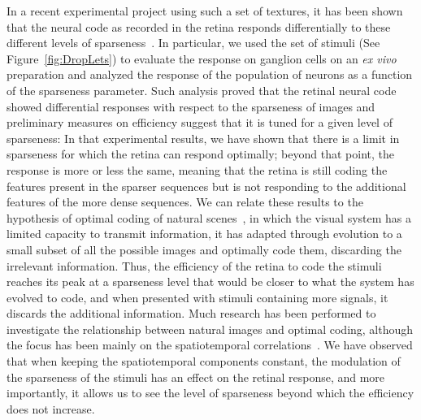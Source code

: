 \documentclass{article}
\begin{document}
In a recent experimental project using such a set of textures, it has been shown that the neural code as recorded in the retina responds differentially to these different levels of sparseness~\citep{Ravello2015}. In particular, we used the set of stimuli (See Figure~\ref{fig:DropLets}) to evaluate the response on ganglion cells on an \emph{ex vivo} preparation and analyzed the response of the population of neurons as a function of the sparseness parameter. Such analysis proved that the retinal neural code showed differential responses with respect to the sparseness of images and preliminary measures on efficiency suggest that it is tuned for a given level of sparseness: In that experimental results, we have shown that there is a limit in sparseness for which the retina can respond optimally; beyond that point, the response is more or less the same, meaning that the retina is still coding the features present in the sparser sequences but is not responding to the additional features of the more dense sequences. We can relate these results to the hypothesis of optimal coding of natural scenes~\citep{Geisler:2008gu}, in which the visual system has a limited capacity to transmit information, it has adapted through evolution to a small subset of all the possible images and optimally code them, discarding the irrelevant information. Thus, the efficiency of the retina to code the stimuli reaches its peak at a sparseness level that would be closer to what the system has evolved to code, and when presented with stimuli containing more signals, it discards the additional information. Much research has been performed to investigate the relationship between natural images and optimal coding, although the focus has been mainly on the spatiotemporal correlations~\citep{Pitkow:2012dh,Rikhye:2015bg}. We have observed that when keeping the spatiotemporal components constant, the modulation of the sparseness of the stimuli has an effect on the retinal response, and more importantly, it allows us to see the level of sparseness beyond which the efficiency does not increase.
\end{document}
